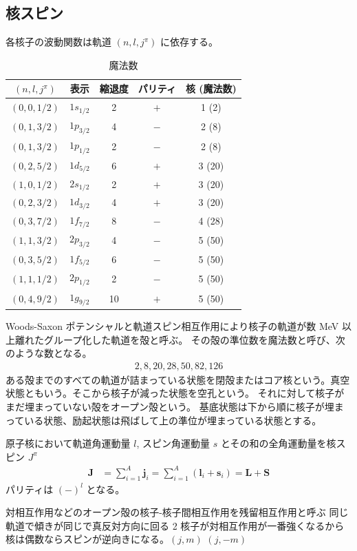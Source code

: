 \documentclass[uplatex,dvipdfmx,a4paper,11pt]{jlreq}
\numberwithin{equation}{section}
\theoremstyle{definition}
\begin{document}
\subsection{核スピン}
各核子の波動関数は軌道 $(n, l, j^\pi)$ に依存する。
\begin{table}[hbtp]
  \centering
  \begin{tabular}{|c|c|c|c|c|}
    \hline
    $(n, l, j^\pi)$ & 表示         & 縮退度 & パリティ & 核 (魔法数) \\
    \hline \hline
    $(0, 0, 1/2)$   & $1s_{1/2}$ & 2   & $+$  & 1 (2)   \\
    $(0, 1, 3/2)$   & $1p_{3/2}$ & 4   & $-$  & 2 (8)   \\
    $(0, 1, 3/2)$   & $1p_{1/2}$ & 2   & $-$  & 2 (8)   \\
    $(0, 2, 5/2)$   & $1d_{5/2}$ & 6   & $+$  & 3 (20)  \\
    $(1, 0, 1/2)$   & $2s_{1/2}$ & 2   & $+$  & 3 (20)  \\
    $(0, 2, 3/2)$   & $1d_{3/2}$ & 4   & $+$  & 3 (20)  \\
    $(0, 3, 7/2)$   & $1f_{7/2}$ & 8   & $-$  & 4 (28)  \\
    $(1, 1, 3/2)$   & $2p_{3/2}$ & 4   & $-$  & 5 (50)  \\
    $(0, 3, 5/2)$   & $1f_{5/2}$ & 6   & $-$  & 5 (50)  \\
    $(1, 1, 1/2)$   & $2p_{1/2}$ & 2   & $-$  & 5 (50)  \\
    $(0, 4, 9/2)$   & $1g_{9/2}$ & 10  & $+$  & 5 (50)  \\
    \hline
  \end{tabular}
  \caption{魔法数}
  \label{table:magic number}
\end{table}

\begin{definition}[殻模型]
  Woods-Saxon ポテンシャルと軌道スピン相互作用により核子の軌道が数 \si{MeV} 以上離れたグループ化した軌道を殻と呼ぶ。
  その殻の準位数を魔法数と呼び、次のような数となる。
  \begin{align}
    2, 8, 20, 28, 50, 82, 126
  \end{align}
  ある殻までのすべての軌道が詰まっている状態を閉殻またはコア核という。真空状態ともいう。そこから核子が減った状態を空孔という。
  それに対して核子がまだ埋まっていない殻をオープン殻という。
  基底状態は下から順に核子が埋まっている状態、励起状態は飛ばして上の準位が埋まっている状態とする。
\end{definition}
\begin{definition}[核スピンとパリティ]
  原子核において軌道角運動量 $l$, スピン角運動量 $s$ とその和の全⾓運動量を核スピン $J^\pi$
  \begin{align}
    \bm{J} & = \sum_{i=1}^{A}\bm{j}_i = \sum_{i=1}^{A}(\bm{l}_i + \bm{s}_i) = \bm{L} + \bm{S}
  \end{align}
  パリティは $(-)^l$ となる。
\end{definition}
対相互作⽤などのオープン殻の核⼦-核⼦間相互作⽤を残留相互作⽤と呼ぶ
同じ軌道で傾きが同じで真反対⽅向に回る 2 核⼦が対相互作⽤が⼀番強くなるから核は偶数ならスピンが逆向きになる。$(j, m)$ $(j, -m)$
\end{document}
